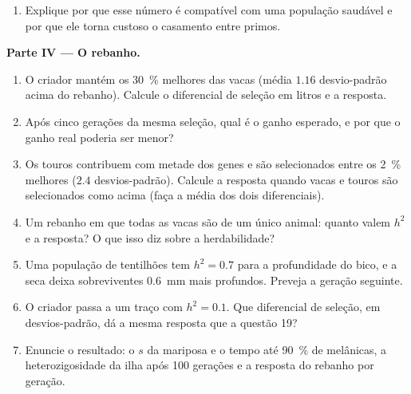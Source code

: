 \begin{problem}
\begin{enumerate}[resume]
        média carrega em estado ? (No
        equilíbrio, cada lócus tem $2\hat q$ cópias por pessoa.)
  \item Explique por que esse número é compatível com uma população
        saudável e por que ele torna custoso o casamento entre primos.
\end{enumerate}
\medskip
\noindent\textbf{Parte IV --- O rebanho.}
\begin{enumerate}[resume]
  \item O criador mantém os \qty{30}{\%} melhores das vacas (média $1.16$
        desvio-padrão acima do rebanho). Calcule o diferencial de
        seleção em litros e a resposta.
  \item Após cinco gerações da mesma seleção, qual é o ganho
        esperado, e por que o ganho real poderia ser menor?
  \item Os touros contribuem com metade dos genes e são selecionados
        entre os \qty{2}{\%} melhores ($2.4$ desvios-padrão). Calcule a
        resposta quando vacas e touros são selecionados como acima
        (faça a média dos dois diferenciais).
  \item Um rebanho em que todas as vacas são  de um único animal:
        quanto valem $h^{2}$ e a resposta? O que isso diz sobre a
        herdabilidade?
  \item Uma população de tentilhões tem $h^{2} = 0.7$ para a
        profundidade do bico, e a seca deixa sobreviventes \qty{0.6}{mm}
        mais profundos. Preveja a geração seguinte.
  \item O criador passa a um traço com $h^{2} = 0.1$. Que
        diferencial de seleção, em desvios-padrão, dá a
        mesma resposta que a questão 19?
  \item Enuncie o resultado: o $s$ da mariposa e o tempo até \qty{90}{\%}
        de melânicas, a heterozigosidade da ilha após 100 gerações
        e a resposta do rebanho por geração.
\end{enumerate}
\end{problem}
